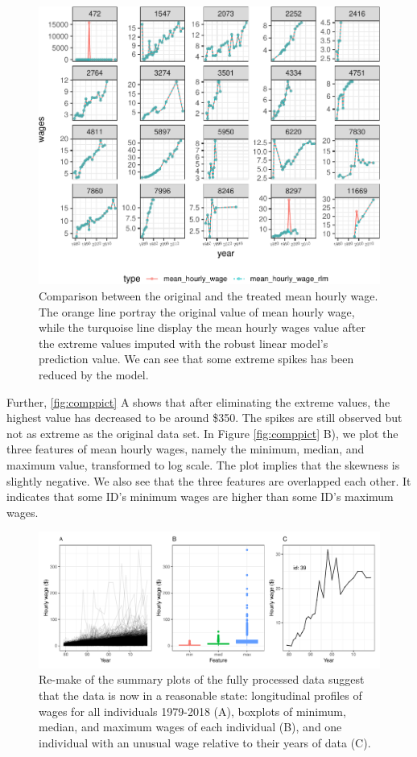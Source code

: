 \documentclass{article}
\begin{document}
\begin{figure}

{\centering \includegraphics[width=432px]{figures/compare-plot-1} 

}

\caption{Comparison between the original and the treated mean hourly wage. The orange line portray the original value of mean hourly wage, while the turquoise line display the mean hourly wages value after the extreme values imputed with the robust linear model's prediction value. We can see that some extreme spikes has been reduced by the model.}\label{fig:compare-plot}
\end{figure}

Further, \ref{fig:comppict} A shows that after eliminating the extreme values, the highest value has decreased to be around \$350. The spikes are still observed but not as extreme as the original data set. In Figure \ref{fig:comppict} B), we plot the three features of mean hourly wages, namely the minimum, median, and maximum value, transformed to log scale. The plot implies that the skewness is slightly negative. We also see that the three features are overlapped each other. It indicates that some ID's minimum wages are higher than some ID's maximum wages.

\begin{figure}

{\centering \includegraphics[width=432px]{figures/fixed-feature-plot-1} 

}

\caption{Re-make of the summary plots of the fully processed data suggest that the data is now in a reasonable state: longitudinal profiles of wages for all individuals 1979-2018 (A), boxplots of minimum, median, and maximum wages of each individual (B), and one individual with an unusual wage relative to their years of data (C). }\label{fig:fixed-feature-plot}
\end{figure}
\end{document}

